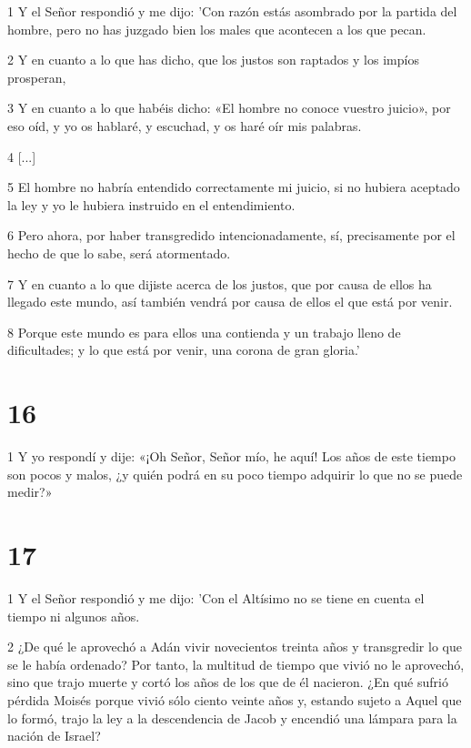 \par 1 Y el Señor respondió y me dijo: 'Con razón estás asombrado por la partida del hombre, pero no has juzgado bien los males que acontecen a los que pecan.

\par 2 Y en cuanto a lo que has dicho, que los justos son raptados y los impíos prosperan,

\par 3 Y en cuanto a lo que habéis dicho: «El hombre no conoce vuestro juicio», por eso oíd, y yo os hablaré, y escuchad, y os haré oír mis palabras.

\par 4 [...]

\par 5 El hombre no habría entendido correctamente mi juicio, si no hubiera aceptado la ley y yo le hubiera instruido en el entendimiento.

\par 6 Pero ahora, por haber transgredido intencionadamente, sí, precisamente por el hecho de que lo sabe, será atormentado.

\par 7 Y en cuanto a lo que dijiste acerca de los justos, que por causa de ellos ha llegado este mundo, así también vendrá por causa de ellos el que está por venir.

\par 8 Porque este mundo es para ellos una contienda y un trabajo lleno de dificultades; y lo que está por venir, una corona de gran gloria.'

\chapter{16}

\par 1 Y yo respondí y dije: «¡Oh Señor, Señor mío, he aquí! Los años de este tiempo son pocos y malos, ¿y quién podrá en su poco tiempo adquirir lo que no se puede medir?»

\chapter{17}

\par 1 Y el Señor respondió y me dijo: 'Con el Altísimo no se tiene en cuenta el tiempo ni algunos años.

\par 2 ¿De qué le aprovechó a Adán vivir novecientos treinta años y transgredir lo que se le había ordenado? Por tanto, la multitud de tiempo que vivió no le aprovechó, sino que trajo muerte y cortó los años de los que de él nacieron. ¿En qué sufrió pérdida Moisés porque vivió sólo ciento veinte años y, estando sujeto a Aquel que lo formó, trajo la ley a la descendencia de Jacob y encendió una lámpara para la nación de Israel?

